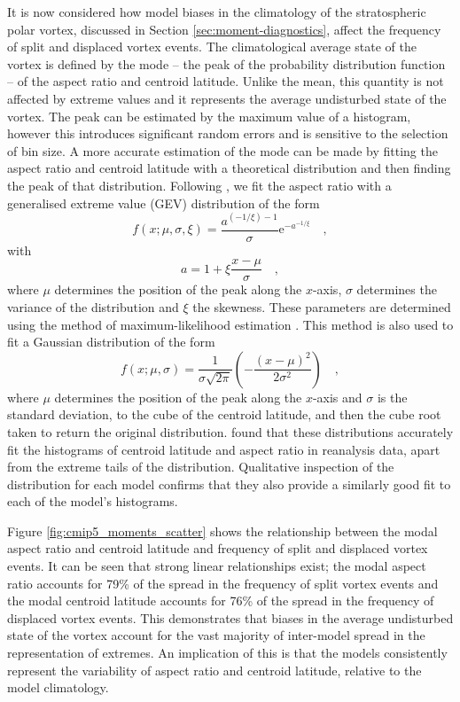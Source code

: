 \bigskip It is now considered how model biases in the climatology of the
stratospheric polar vortex, discussed in Section \ref{sec:moment-diagnostics},
affect the frequency of split and displaced vortex events. The climatological
average state of the vortex is defined by the mode -- the peak of the
probability distribution function -- of the aspect ratio and centroid
latitude. Unlike the mean, this quantity is not affected by extreme values and
it represents the average undisturbed state of the vortex. The peak can be
estimated by the maximum value of a histogram, however this introduces
significant random errors and is sensitive to the selection of bin size. A more
accurate estimation of the mode can be made by fitting the aspect ratio and
centroid latitude with a theoretical distribution and then finding the peak of
that distribution. Following \citet{Mitchell2011}, we fit the aspect ratio with
a generalised extreme value (GEV) distribution of the form
\begin{equation}
f(x;\mu,\sigma,\xi) = \frac{a^{(-1/\xi)-1}}{\sigma}\mathrm{e}^{{-a}^{-1/\xi}}
\quad , 
\end{equation}
with
\begin{equation} 
a = 1 + \xi \frac{x-\mu}{\sigma} \quad ,
\end{equation}
where $\mu$ determines the position of the peak along the $x$-axis, $\sigma$
determines the variance of the distribution and $\xi$ the skewness. These
parameters are determined using the method of maximum-likelihood estimation
\citep{Wilks}. This method is also used to fit a Gaussian distribution of the
form
\begin{equation}
f(x;\mu,\sigma) = \frac{1}{\sigma\sqrt{2\pi}} \left(
  -\frac{(x-\mu)^2}{2\sigma^{2}} \right) \quad ,
\end{equation}
where $\mu$ determines the position of the peak along the $x$-axis and $\sigma$
is the standard deviation, to the cube of the centroid latitude, and then the
cube root taken to return the original distribution. \citet{Mitchell2011} found
that these distributions accurately fit the histograms of centroid latitude and
aspect ratio in reanalysis data, apart from the extreme tails of the
distribution. Qualitative inspection of the distribution for each model confirms
that they also provide a similarly good fit to each of the model's histograms.

Figure \ref{fig:cmip5_moments_scatter} shows the relationship between the modal
aspect ratio and centroid latitude and frequency of split and displaced vortex
events. It can be seen that strong linear relationships exist; the modal aspect
ratio accounts for 79\% of the spread in the frequency of split vortex events
and the modal centroid latitude accounts for 76\% of the spread in the frequency
of displaced vortex events. This demonstrates that biases in the average
undisturbed state of the vortex account for the vast majority of inter-model
spread in the representation of extremes. An implication of this is that the
models consistently represent the variability of aspect ratio and centroid
latitude, relative to the model climatology.

